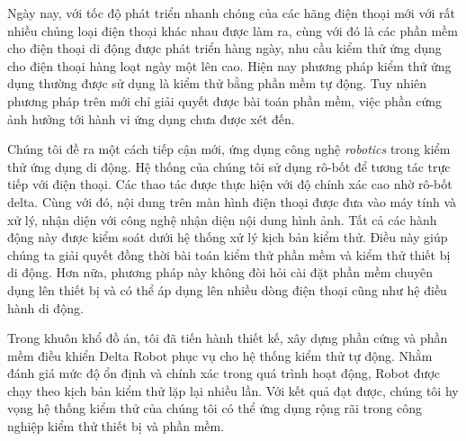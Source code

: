 \begin{vnabstract}
	\indent Ngày nay, với tốc độ phát triển nhanh chóng của các hãng điện thoại mới với rất nhiều chủng loại điện thoại khác nhau được làm ra, cùng với đó là các phần mềm cho điện thoại di động được phát triển hàng ngày, nhu cầu kiểm thử ứng dụng cho điện thoại hàng loạt ngày một lên cao. Hiện nay phương pháp kiểm thử ứng dụng thường được sử dụng là kiểm thử bằng phần mềm tự động. Tuy nhiên phương pháp trên mới chỉ giải quyết được bài toán phần mềm, việc phần cứng ảnh hưởng tới hành vi ứng dụng chưa được xét đến.
	
	Chúng tôi đề ra một cách tiếp cận mới, ứng dụng công nghệ \textit{robotics} trong kiểm thử ứng dụng di động. Hệ thống của chúng tôi sử dụng rô-bốt để tương tác trực tiếp với điện thoại. Các thao tác được thực hiện với độ chính xác cao nhờ rô-bốt delta. Cùng với đó, nội dung trên màn hình điện thoại được đưa vào máy tính và xử lý, nhận diện với công nghệ nhận diện nội dung hình ảnh. Tất cả các hành động này được kiểm soát dưới hệ thống xử lý kịch bản kiểm thử. Điều này giúp chúng ta giải quyết đồng thời bài toán kiểm thử phần mềm và kiểm thử thiết bị di động. Hơn nữa, phương pháp này không đòi hỏi cài đặt phần mềm chuyên dụng lên thiết bị và có thể áp dụng lên nhiều dòng điện thoại cũng như hệ điều hành di động.
	
	Trong khuôn khổ đồ án, tôi đã tiến hành thiết kế, xây dựng phần cứng và phần mềm điều khiển Delta Robot phục vụ cho hệ thống kiểm thử tự động. Nhằm đánh giá mức độ ổn định và chính xác trong quá trình hoạt động, Robot được chạy theo kịch bản kiểm thử lặp lại nhiều lần. Với kết quả đạt được, chúng tôi hy vọng hệ thống kiểm thử của chúng tôi có thể ứng dụng rộng rãi trong công nghiệp kiểm thử thiết bị và phần mềm.

\end{vnabstract}